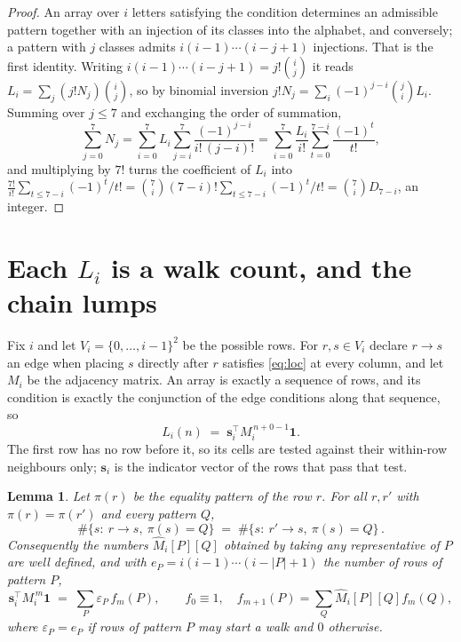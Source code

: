 \documentclass[11pt,a4paper]{article}
\theoremstyle{plain}
\newtheorem{lemma}[theorem]{Lemma}
\theoremstyle{definition}
\begin{document}
\begin{proof}
An array over $i$ letters satisfying the condition determines an admissible pattern together
with an injection of its classes into the alphabet, and conversely; a pattern with $j$
classes admits $i(i-1)\cdots(i-j+1)$ injections. That is the first identity. Writing
$i(i-1)\cdots(i-j+1)=j!\binom{i}{j}$ it reads $L_i=\sum_j (j!N_j)\binom{i}{j}$, so by
binomial inversion $j!N_j=\sum_{i}(-1)^{j-i}\binom{j}{i}L_i$. Summing over
$j\le 7$ and exchanging the order of summation,
\[
\sum_{j=0}^{7}N_j=\sum_{i=0}^{7}L_i\sum_{j=i}^{7}\frac{(-1)^{j-i}}{i!\,(j-i)!}
=\sum_{i=0}^{7}\frac{L_i}{i!}\sum_{t=0}^{7-i}\frac{(-1)^t}{t!} ,
\]
and multiplying by $7!$ turns the coefficient of $L_i$ into
$\frac{7!}{i!}\sum_{t\le 7-i}(-1)^t/t!=\binom{7}{i}(7-i)!\sum_{t\le 7-i}(-1)^t/t!
=\binom{7}{i}D_{7-i}$, an integer.
\end{proof}

\section{Each $L_i$ is a walk count, and the chain lumps}

Fix $i$ and let $V_i=\{0,\dots,i-1\}^{2}$ be the possible rows. For $r,s\in V_i$
declare $r\to s$ an edge when placing $s$ directly after $r$ satisfies \eqref{eq:loc} at
every column, and let $M_i$ be the adjacency matrix. An array is exactly a sequence of
rows, and its condition is exactly the conjunction of the edge conditions along that
sequence, so
\[
L_i(n)\;=\;\mathbf{s}_i^{\!\top}M_i^{\,n+0-1}\mathbf{1} .
\]
The first row has no row before it, so its cells are tested
against their within-row neighbours only; $\mathbf{s}_i$ is the indicator vector of the
rows that pass that test.

\begin{lemma}\label{lem:lump}
Let $\pi(r)$ be the equality pattern of the row $r$. For all $r,r'$ with
$\pi(r)=\pi(r')$ and every pattern $Q$,
\[
\#\{s:\ r\to s,\ \pi(s)=Q\}\;=\;\#\{s:\ r'\to s,\ \pi(s)=Q\}\, .
\]
Consequently the numbers $\widehat M_i[P][Q]$ obtained by taking any representative of $P$
are well defined, and with $e_P=i(i-1)\cdots(i-|P|+1)$ the number of rows of pattern $P$,
\[
\mathbf{s}_i^{\!\top}M_i^{\,m}\mathbf{1}\;=\;\sum_P \varepsilon_P\,f_m(P),
\qquad f_0\equiv1,\quad f_{m+1}(P)=\sum_Q\widehat M_i[P][Q]f_m(Q),
\]
where $\varepsilon_P=e_P$ if rows of pattern $P$ may start a walk and $0$ otherwise.
\end{lemma}
\end{document}
